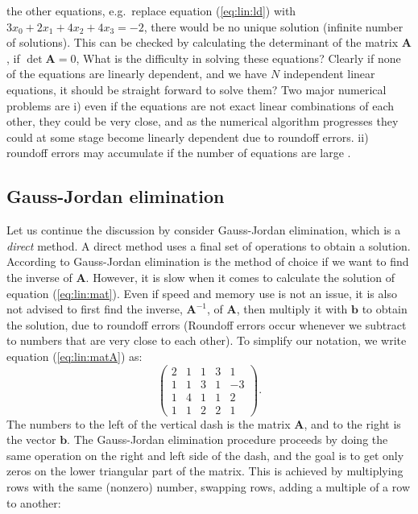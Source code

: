 \documentclass[graybox,sectrefs,envcountresetchap,open=right,final]{svmonodo}
\begin{document}
the other equations, e.g.~replace equation (\ref{eq:lin:ld}) with
$3x_0+2x_1+4x_2+4x_3=-2$, there would be no unique solution (infinite
number of solutions). This can be checked by calculating the determinant of the matrix $\mathbf{A}$, if $\det \mathbf{A}=0 $,  
What is the difficulty in solving these equations? Clearly if none of the equations are linearly dependent, and we have $N$ independent linear equations, it should be straight forward to solve them? Two major numerical problems are i) even if the equations are not exact linear combinations of each other, they could be very close, and as the numerical algorithm progresses they could at some stage become linearly dependent due to roundoff errors. ii) roundoff errors may accumulate if the number of equations are large \cite{press2007}.

\subsection{Gauss-Jordan elimination}
Let us continue the discussion by consider Gauss-Jordan elimination, which is a \emph{direct} method. A direct method uses a final set of operations to obtain a solution. According to \cite{press2007} Gauss-Jordan elimination is the method of choice if we want to find the inverse of $\mathbf{A}$. However, it is slow when it comes to calculate the solution of equation
(\ref{eq:lin:mat}). Even if speed and memory use is not an issue, it is also not advised to first find the inverse, $\mathbf{A}^{-1}$, of $\mathbf{A}$, then multiply it with $\mathbf{b}$ to obtain the solution, due to roundoff errors (Roundoff errors occur whenever we subtract to numbers that are very close to each other). To simplify our notation, we write equation (\ref{eq:lin:matA}) as:
\begin{equation}
\left(
\begin{array}{cccc|c}
2&1&1&3&1\\ 
1&1&3&1&-3\\ 
1&4&1&1&2\\ 
1&1&2&2&1
\end{array}
\right).
\end{equation}
The numbers to the left of the vertical dash is the matrix $\mathbf{A}$, and to the right is the vector $\mathbf{b}$. The Gauss-Jordan elimination procedure proceeds by doing the same operation on the right and left side of the dash, and the goal is to get only zeros on the lower triangular part of the matrix. This is achieved by multiplying rows with the same (nonzero) number, swapping rows, adding a multiple of a row to another:
\end{document}
